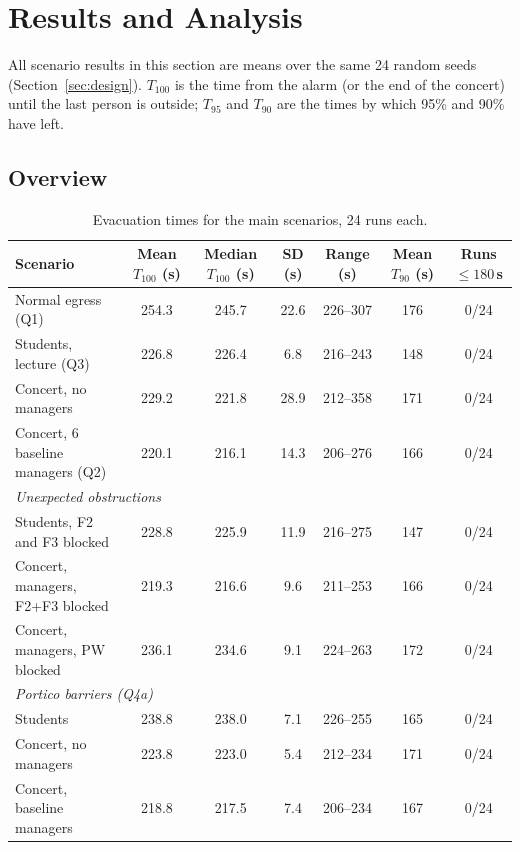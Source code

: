 \documentclass{article}
\begin{document}
\newpage
\section{Results and Analysis}
\label{sec:results}

All scenario results in this section are means over the same 24 random seeds (Section~\ref{sec:design}). $T_{100}$ is the time from the alarm (or the end of the concert) until the last person is outside; $T_{95}$ and $T_{90}$ are the times by which 95\% and 90\% have left.

\subsection{Overview}

\begin{table}[H]
    \centering
    \small
    \begin{tabular}{lcccccc}
        \toprule
        Scenario & \shortstack{Mean\\$T_{100}$ (s)} & \shortstack{Median\\$T_{100}$ (s)} & SD (s) & Range (s) & \shortstack{Mean\\$T_{90}$ (s)} & \shortstack{Runs\\$\leq 180$\,s} \\
        \midrule
        Normal egress (Q1) & 254.3 & 245.7 & 22.6 & 226--307 & 176 & 0/24 \\
        Students, lecture (Q3) & 226.8 & 226.4 & 6.8 & 216--243 & 148 & 0/24 \\
        Concert, no managers & 229.2 & 221.8 & 28.9 & 212--358 & 171 & 0/24 \\
        Concert, 6 baseline managers (Q2) & 220.1 & 216.1 & 14.3 & 206--276 & 166 & 0/24 \\
        \midrule
        \multicolumn{7}{l}{\emph{Unexpected obstructions}}\\
        Students, F2 and F3 blocked & 228.8 & 225.9 & 11.9 & 216--275 & 147 & 0/24 \\
        Concert, managers, F2+F3 blocked & 219.3 & 216.6 & 9.6 & 211--253 & 166 & 0/24 \\
        Concert, managers, PW blocked & 236.1 & 234.6 & 9.1 & 224--263 & 172 & 0/24 \\
        \midrule
        \multicolumn{7}{l}{\emph{Portico barriers (Q4a)}}\\
        Students & 238.8 & 238.0 & 7.1 & 226--255 & 165 & 0/24 \\
        Concert, no managers & 223.8 & 223.0 & 5.4 & 212--234 & 171 & 0/24 \\
        Concert, baseline managers & 218.8 & 217.5 & 7.4 & 206--234 & 167 & 0/24 \\
        \bottomrule
    \end{tabular}
    \caption{Evacuation times for the main scenarios, 24 runs each.}
    \label{tab:scenarios}
\end{table}
\end{document}

